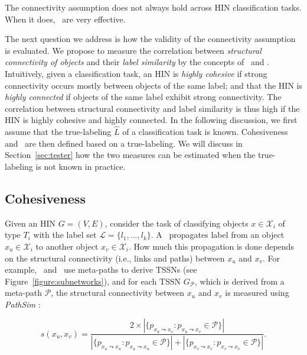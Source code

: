 \begin{conclusion}
The connectivity assumption does not always hold across HIN classification tasks. When it does, \tcrs\ 
are very effective.
\end{conclusion}

The next question we address is how the validity of the connectivity assumption is evaluated.   
We propose to measure the correlation between {\it structural connectivity of objects} and their {\it label similarity} by 
the concepts of \chn\ and \cnn. 
Intuitively, given a classification task,
an HIN is {\it highly cohesive} if strong connectivity occurs mostly between objects of the same label;
and that the HIN is {\it highly connected} if objects of the same label exhibit strong connectivity.
The correlation between structural connectivity and label similarity is thus high if the HIN is highly cohesive and highly connected.
In the following discussion, we first assume that the true-labeling $\hat{L}$ of a classification task is known.
Cohesiveness and \cnn\ are then defined based on a true-labeling. 
We will discuss in Section~\ref{sec:tester} how the two measures can be estimated when the true-labeling is not known in practice. 

\subsection{Cohesiveness}

Given an HIN $G=(V,E)$,
consider the  task of classifying objects $x \in \mathcal{X}_i$ of type $T_i$ 
with the label set $\mathcal{L} = \{l_1, ..., l_k\}$.
A \tcr\ propagates label from an object $x_u \in \mathcal{X}_i$ to another 
object $x_v \in \mathcal{X}_i$. 
How much this propagation is done depends on the structural connectivity (i.e., links and paths) between $x_u$ and $x_v$.
For example, \hpm\ and \gm\ use meta-paths to derive TSSNs (see Figure~\ref{figure:subnetworks}),
and for each TSSN $G_{\mathcal{P}}$,  which is derived from a meta-path $\mathcal{P}$, 
the structural connectivity between $x_u$ and $x_v$ is measured using \emph{PathSim} \cite{DBLP:dblp_journals/pvldb/SunHYYW11}:

{\small
\begin{equation}
\nonumber
\label{eq:pathsim}
s(x_u, x_v) = \frac{2 \times |\{p_{x_u \leadsto x_v}:p_{x_u \leadsto x_v} \in \mathcal{P}\}|}{|\{p_{x_u \leadsto x_u}:p_{x_u \leadsto x_u} \in \mathcal{P}\}|+|\{p_{x_v \leadsto x_v}:p_{x_v \leadsto x_v} \in \mathcal{P}\}|}.
\end{equation}}

